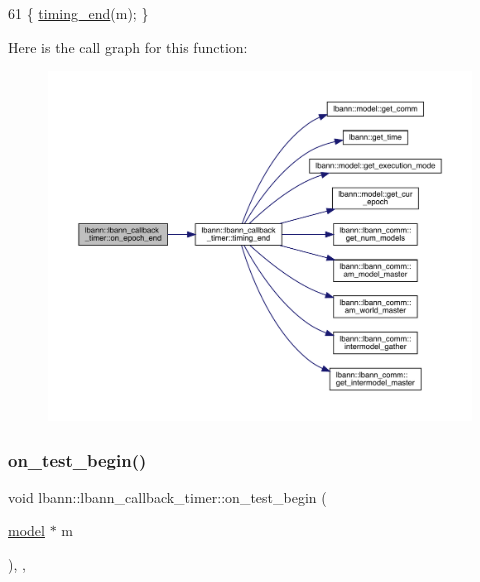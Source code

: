 \begin{DoxyCode}
61 \{ \hyperlink{classlbann_1_1lbann__callback__timer_a955e59858c6803e96b21fe494cdf3971}{timing\_end}(m); \}
\end{DoxyCode}
Here is the call graph for this function\+:\nopagebreak
\begin{figure}[H]
\begin{center}
\leavevmode
\includegraphics[width=350pt]{classlbann_1_1lbann__callback__timer_a95ccee037894dbb5e3c663fbdfbc9d7f_cgraph}
\end{center}
\end{figure}
\mbox{\label{classlbann_1_1lbann__callback__timer_a9fb5327fa629c23e51c9c3b065d6d8c5}} 
\subsubsection{\texorpdfstring{on\+\_\+test\+\_\+begin()}{on\_test\_begin()}}
{\footnotesize\ttfamily void lbann\+::lbann\+\_\+callback\+\_\+timer\+::on\+\_\+test\+\_\+begin (\begin{DoxyParamCaption}\item[{\hyperlink{classlbann_1_1model}{model} $\ast$}]{m }\end{DoxyParamCaption})\hspace{0.3cm}{\ttfamily [inline]}, {\ttfamily [override]}, {\ttfamily [virtual]}}

